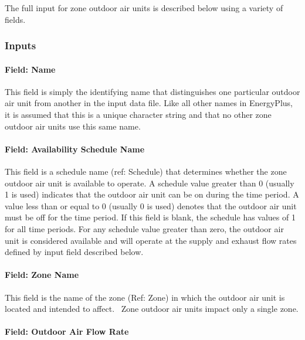 The full input for zone outdoor air units is described below using a variety of fields.

\subsubsection{Inputs}\label{inputs-5-035}

\paragraph{Field: Name}\label{field-name-5-029}

This field is simply the identifying name that distinguishes one particular outdoor air unit from another in the input data file. Like all other names in EnergyPlus, it is assumed that this is a unique character string and that no other zone outdoor air units use this same name.

\paragraph{Field: Availability Schedule Name}\label{field-availability-schedule-name-5-005}

This field is a schedule name (ref: Schedule) that determines whether the zone outdoor air unit is available to operate. A schedule value greater than 0 (usually 1 is used) indicates that the outdoor air unit can be on during the time period. A value less than or equal to 0 (usually 0 is used) denotes that the outdoor air unit must be off for the time period. If this field is blank, the schedule has values of 1 for all time periods. For any schedule value greater than zero, the outdoor air unit is considered available and will operate at the supply and exhaust flow rates defined by input field described below.

\paragraph{Field: Zone Name}\label{field-zone-name-016}

This field is the name of the zone (Ref: Zone) in which the outdoor air unit is located and intended to affect.~ Zone outdoor air units impact only a single zone.

\paragraph{Field: Outdoor Air Flow Rate}\label{field-outdoor-air-flow-rate}

